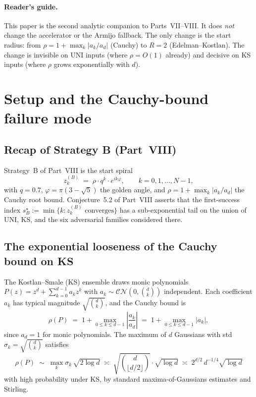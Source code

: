 \documentclass[11pt,a4paper]{article}
\begin{document}
\paragraph{Reader's guide.}
This paper is the second analytic companion to Parts~VII--VIII. It does \emph{not} change the accelerator or the Armijo fallback. The only change is the start radius: from $\rho = 1 + \max_k|a_k/a_d|$ (Cauchy) to $R = 2$ (Edelman--Kostlan). The change is invisible on UNI inputs (where $\rho = O(1)$ already) and decisive on KS inputs (where $\rho$ grows exponentially with $d$).

\tableofcontents

\section{Setup and the Cauchy-bound failure mode}\label{sec:setup}

\subsection{Recap of Strategy B (Part~VIII)}
Strategy~B of Part~VIII is the start spiral
\begin{equation}\label{eq:strategy-B}
z_k^{(B)} \;=\; \rho \cdot q^{k} \cdot e^{i k \varphi},
\qquad k = 0, 1, \dots, N - 1,
\end{equation}
with $q = 0.7$, $\varphi = \pi(3 - \sqrt 5)$ the golden angle, and $\rho = 1 + \max_k |a_k/a_d|$ the Cauchy root bound. Conjecture~5.2 of Part~VIII asserts that the first-success index $s^\star_B := \min\{k : z_k^{(B)} \text{ converges}\}$ has a sub-exponential tail on the union of UNI, KS, and the six adversarial families considered there.

\subsection{The exponential looseness of the Cauchy bound on KS}

The Kostlan--Smale (KS) ensemble draws monic polynomials $P(z) = z^{d} + \sum_{k=0}^{d-1} a_k z^k$ with $a_k \sim \mathcal{CN}(0, \binom{d}{k})$ independent. Each coefficient $a_k$ has typical magnitude $\sqrt{\binom{d}{k}}$, and the Cauchy bound is
\begin{equation}\label{eq:rho-KS}
\rho(P) \;=\; 1 + \max_{0 \le k \le d-1} \left|\frac{a_k}{a_d}\right| \;=\; 1 + \max_{0 \le k \le d-1} |a_k|,
\end{equation}
since $a_d = 1$ for monic polynomials. The maximum of $d$ Gaussians with std $\sigma_k = \sqrt{\binom{d}{k}}$ satisfies
\begin{equation}\label{eq:rho-typical}
\rho(P) \;\sim\; \max_{k} \sigma_k \,\sqrt{2\log d}
\;\asymp\; \sqrt{\binom{d}{\lfloor d/2 \rfloor}} \cdot \sqrt{\log d}
\;\asymp\; 2^{d/2} \, d^{-1/4} \sqrt{\log d}
\end{equation}
with high probability under KS, by standard maxima-of-Gaussians estimates and Stirling.
\end{document}
